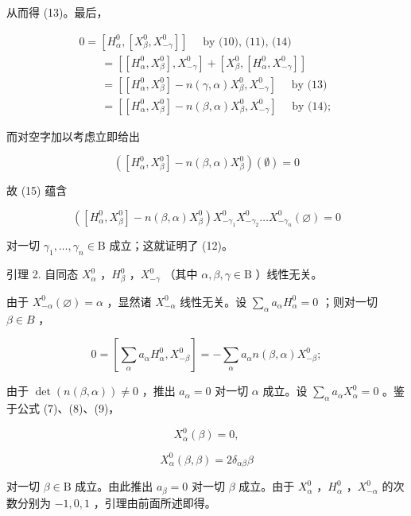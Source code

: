 从而得 (13)。最后，

\[
\begin{array}{l} 0 = [ H _ {\alpha} ^ {0}, [ X _ {\beta} ^ {0}, X _ {- \gamma} ^ {0} ] ] \quad \text { by (10), (11), (14)} \\ \qquad = [ [ H _ {\alpha} ^ {0}, X _ {\beta} ^ {0} ], X _ {- \gamma} ^ {0} ] + [ X _ {\beta} ^ {0}, [ H _ {\alpha} ^ {0}, X _ {- \gamma} ^ {0} ] ] \\ \qquad = [ [ H _ {\alpha} ^ {0}, X _ {\beta} ^ {0} ] - n (\gamma , \alpha) X _ {\beta} ^ {0}, X _ {- \gamma} ^ {0} ] \quad \text { by (13)} \\ \qquad = [ [ H _ {\alpha} ^ {0}, X _ {\beta} ^ {0} ] - n (\beta , \alpha) X _ {\beta} ^ {0}, X _ {- \gamma} ^ {0} ] \quad \text { by (14); } \end{array}\tag{15}
\]

而对空字加以考虑立即给出

\[
([ H _ {\alpha} ^ {0}, X _ {\beta} ^ {0} ] - n (\beta , \alpha) X _ {\beta} ^ {0}) (\emptyset) = 0
\]

故 (15) 蕴含

\[
\left(\left[ H _ {\alpha} ^ {0}, X _ {\beta} ^ {0} \right] - n (\beta , \alpha) X _ {\beta} ^ {0}\right) X _ {- \gamma_ {1}} ^ {0} X _ {- \gamma_ {2}} ^ {0} \dots X _ {- \gamma_ {n}} ^ {0} (\varnothing) = 0
\]

对一切 \(\gamma_1, \ldots, \gamma_n \in \mathrm{B}\) 成立；这就证明了 (12)。

引理 2. 自同态 \(X_{\alpha}^{0}\) ，\(H_{\beta}^{0}\) ，\(X_{-\gamma}^{0}\) （其中 \(\alpha, \beta, \gamma \in \mathrm{B}\) ）线性无关。

由于 \(X_{-\alpha}^{0}(\varnothing) = \alpha\) ，显然诸 \(X_{-\alpha}^{0}\) 线性无关。设 \(\sum_{\alpha} a_{\alpha} H_{\alpha}^{0} = 0\) ；则对一切 \(\beta \in B\) ，

\[
0 = \left[ \sum_ {\alpha} a _ {\alpha} H _ {\alpha} ^ {0}, X _ {- \beta} ^ {0} \right] = - \sum_ {\alpha} a _ {\alpha} n (\beta , \alpha) X _ {- \beta} ^ {0};
\]

由于 \(\operatorname{det}(n(\beta, \alpha)) \neq 0\) ，推出 \(a_{\alpha} = 0\) 对一切 \(\alpha\) 成立。设 \(\sum_{\alpha} a_{\alpha} X_{\alpha}^{0} = 0\) 。鉴于公式 (7)、(8)、(9)，

\[
X _ {\alpha} ^ {0} (\beta) = 0,
\]

\[
X _ {\alpha} ^ {0} (\beta , \beta) = 2 \delta_ {\alpha \beta} \beta
\]

对一切 \(\beta \in \mathrm{B}\) 成立。由此推出 \(a_{\beta} = 0\) 对一切 \(\beta\) 成立。由于 \(X_{\alpha}^{0}\) ，\(H_{\alpha}^{0}\) ，\(X_{-\alpha}^{0}\) 的次数分别为 \(-1, 0, 1\) ，引理由前面所述即得。

